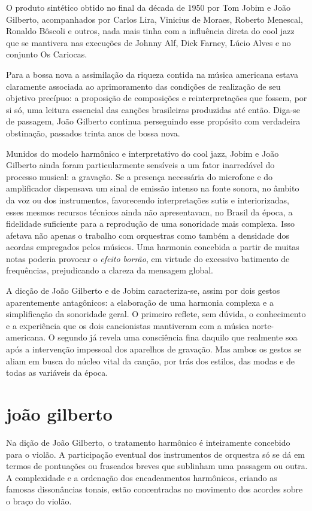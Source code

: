O produto sintético obtido no final da década de 1950 por Tom Jobim e João
Gilberto, acompanhados por Carlos Lira, Vinicius de Moraes, Roberto
Menescal, Ronaldo Bôscoli e outros, nada mais tinha com a influência
direta do cool jazz que se mantivera nas execuções de Johnny Alf, Dick
Farney, Lúcio Alves e no conjunto Os Cariocas.

Para a bossa nova a assimilação da riqueza contida na música americana
estava claramente associada ao aprimoramento das condições de realização
de seu objetivo precípuo: a proposição de composições e reinterpretações
que fossem, por si só, uma leitura essencial das canções brasileiras
produzidas até então. Diga-se de passagem, João Gilberto continua
perseguindo esse propósito com verdadeira obstinação, passados trinta
anos de bossa nova.

Munidos do modelo harmônico e interpretativo do cool jazz, Jobim e João
Gilberto ainda foram particularmente sensíveis a um fator inarredável do
processo musical: a gravação. Se a presença necessária do microfone e do
amplificador dispensava um sinal de emissão intenso na fonte sonora, no
âmbito da voz ou dos instrumentos, favorecendo interpretações sutis e
interiorizadas, esses mesmos recursos técnicos ainda não apresentavam,
no Brasil da época, a fidelidade suficiente para a reprodução de uma
sonoridade mais complexa. Isso afetava não apenas o trabalho com
orquestras como também a densidade dos acordas empregados pelos músicos.
Uma harmonia concebida a partir de muitas notas poderia provocar o
\textit{efeito borrão}, em virtude do excessivo batimento de frequências,
prejudicando a clareza da mensagem global.

A dicção de João Gilberto e de Jobim caracteriza-se, assim por dois
gestos aparentemente antagônicos: a elaboração de uma harmonia complexa
e a simplificação da sonoridade geral. O primeiro reflete, sem dúvida, o
conhecimento e a experiência que os dois cancionistas mantiveram com a
música norte-americana. O segundo já revela uma consciência fina daquilo
que realmente soa após a intervenção impessoal dos aparelhos de
gravação. Mas ambos os gestos se aliam em busca do núcleo vital da
canção, por trás dos estilos, das modas e de todas as variáveis da
época.

\section{joão gilberto}

Na dição de João Gilberto, o tratamento harmônico é inteiramente
concebido para o violão. A participação eventual dos instrumentos de
orquestra só se dá em termos de pontuações ou fraseados breves que
sublinham uma passagem ou outra. A complexidade e a ordenação dos
encadeamentos harmônicos, criando as famosas dissonâncias tonais, estão
concentradas no movimento dos acordes sobre o braço do violão.

